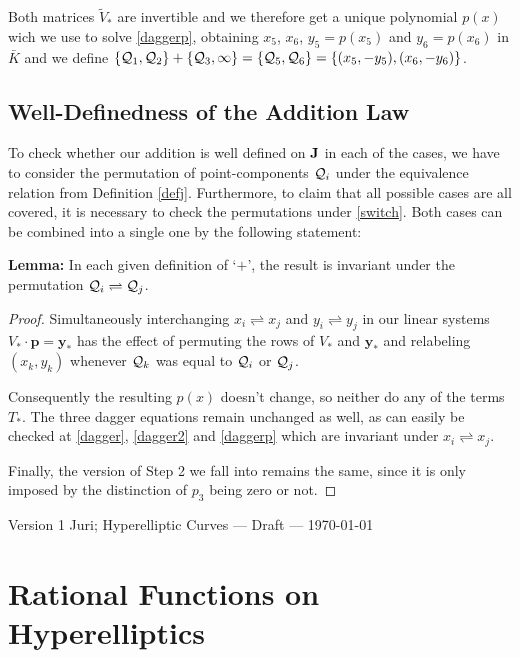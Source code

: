\documentclass[english,11pt,a4paper]{article}
\begin{document}
  Both matrices $\tilde V_{\ast}$ are invertible and we therefore get a unique polynomial $p(x)$ wich we use to solve \eqref{daggerp}, obtaining $x_5$, $x_6$, $y_5=p(x_5)$ and $y_6=p(x_6)$ in $\bar K$ and we define $\{ \mathcal{Q}_1 , \mathcal{Q}_2\}+\{ \mathcal{Q}_3 , \infty \} = \{ \mathcal{Q}_5 , \mathcal{Q}_6 \} = \{(x_5,-y_5),(x_6,-y_6)\}$.

\subsection{Well-Definedness of the Addition Law}

To check whether our addition is well defined on $\mathbf{J}$ in each of the cases, we have to consider the permutation of point-components $\mathcal{Q}_i$ under the equivalence relation from Definition \ref{defj}. Furthermore, to claim that all possible cases are all covered, it is necessary to check the permutations under \eqref{switch}. Both cases can be combined into a single one by the following statement:

\textbf{Lemma:} In each given definition of `$+$', the result is invariant under the permutation $\mathcal{Q}_i \rightleftharpoons \mathcal{Q}_j$.

\begin{proof}
  Simultaneously interchanging $x_i \rightleftharpoons x_j$ and $y_i \rightleftharpoons y_j$ in our linear systems $V_{\ast} \cdot \mathbf{p} = \mathbf{y}_{\ast}$ has the effect of permuting the rows of $V_{\ast}$ and $\mathbf{y}_{\ast}$ and relabeling $(x_k,y_k)$ whenever $\mathcal{Q}_k$ was equal to $\mathcal{Q}_i$ or $\mathcal{Q}_j$.

  Consequently the resulting $p(x)$ doesn't change, so neither do any of the terms $T_{\ast}$. The three dagger equations remain unchanged as well, as can easily be checked at \eqref{dagger}, \eqref{dagger2} and \eqref{daggerp} which are invariant under $x_i \rightleftharpoons x_j$.

  Finally, the version of Step 2 we fall into remains the same, since it is only imposed by the distinction of $p_3$ being zero or not.
\end{proof}


\newpage


Version 1 \scriptsize \hfill Juri; Hyperelliptic Curves --- Draft --- \today
\normalsize

\section{Rational Functions on Hyperelliptics}
\end{document}
